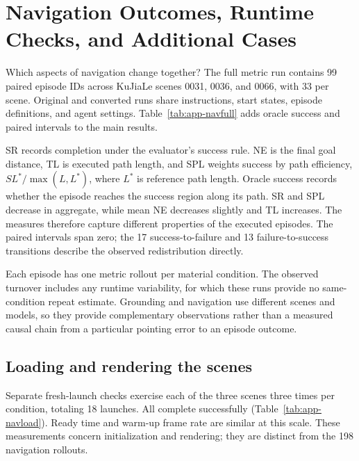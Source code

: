 \section{Navigation Outcomes, Runtime Checks, and Additional Cases}
\label{app:navigation}

Which aspects of navigation change together? The full metric run contains
99 paired episode IDs across KuJiaLe scenes 0031, 0036, and 0066, with 33
per scene. Original and converted runs share instructions, start states,
episode definitions, and agent settings. Table~\ref{tab:app-navfull} adds
oracle success and paired intervals to the main results.

\begin{table}[htbp]
\centering\small
\setlength{\tabcolsep}{4pt}

\caption{Navigation metrics over all 99 episode pairs. Differences are
Converted minus Original. SR, SPL, and oracle success use percentages;
NE and TL retain the evaluator's distance units. Intervals are the recorded
95\% paired bootstrap intervals; dashes denote metrics without a retained
interval. Fall rate (FR) and stuck rate (StR) are fractions of episodes
with the corresponding recorded failure reason.}
\label{tab:app-navfull}
\end{table}

SR records completion under the evaluator's success rule. NE is the final goal
distance, TL is executed path length, and SPL weights success by path efficiency,
$S L^*/\max(L,L^*)$, where $L^*$ is reference path length. Oracle success
records whether the episode reaches the success region along its path. SR and
SPL decrease in aggregate, while mean NE decreases slightly and TL increases.
The measures therefore capture different properties of the executed episodes.
The paired intervals span zero; the 17 success-to-failure and 13
failure-to-success transitions describe the observed redistribution directly.

Each episode has one metric rollout per material condition. The observed
turnover includes any runtime variability, for which these runs provide no
same-condition repeat estimate. Grounding and navigation use different scenes
and models, so they provide complementary observations rather than a measured
causal chain from a particular pointing error to an episode outcome.

\subsection{Loading and rendering the scenes}
Separate fresh-launch checks exercise each of the three scenes three times
per condition, totaling 18 launches. All complete successfully
(Table~\ref{tab:app-navload}). Ready time and warm-up frame rate are similar
at this scale. These measurements concern initialization and rendering; they
are distinct from the 198 navigation rollouts.

